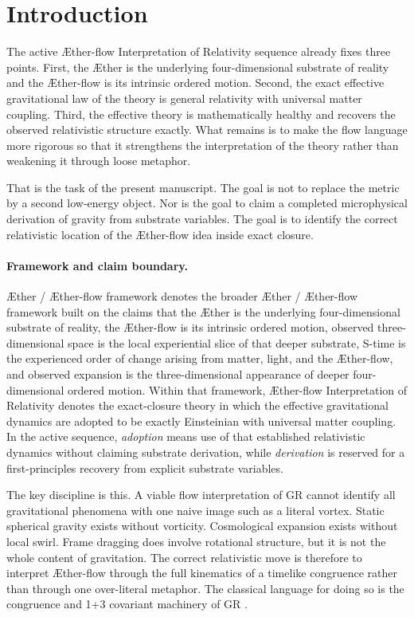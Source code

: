 \documentclass[11pt]{article}
\newcommand{\Aether}{\AE{}ther}
\newcommand{\Aflow}{\AE{}ther-flow}
\newcommand{\TheoryName}{\Aflow{} Interpretation of Relativity}
\newcommand{\TheoryProgram}{\Aether{} / \Aflow{} framework}
\begin{document}
\section{Introduction}

The active \TheoryName{} sequence already fixes three points. First, the \Aether{} is the underlying four-dimensional substrate of reality and the \Aflow{} is its intrinsic ordered motion. Second, the exact effective gravitational law of the theory is general relativity with universal matter coupling. Third, the effective theory is mathematically healthy and recovers the observed relativistic structure exactly. What remains is to make the flow language more rigorous so that it strengthens the interpretation of the theory rather than weakening it through loose metaphor.

That is the task of the present manuscript. The goal is not to replace the metric by a second low-energy object. Nor is the goal to claim a completed microphysical derivation of gravity from substrate variables. The goal is to identify the correct relativistic location of the \Aflow{} idea inside exact closure.

\paragraph{Framework and claim boundary.}
\TheoryProgram{} denotes the broader \Aether{} / \Aflow{} framework built on the claims that the \Aether{} is the underlying four-dimensional substrate of reality, the \Aflow{} is its intrinsic ordered motion, observed three-dimensional space is the local experiential slice of that deeper substrate, S-time is the experienced order of change arising from matter, light, and the \Aflow{}, and observed expansion is the three-dimensional appearance of deeper four-dimensional ordered motion. Within that framework, \TheoryName{} denotes the exact-closure theory in which the effective gravitational dynamics are adopted to be exactly Einsteinian with universal matter coupling. In the active sequence, \emph{adoption} means use of that established relativistic dynamics without claiming substrate derivation, while \emph{derivation} is reserved for a first-principles recovery from explicit substrate variables.

The key discipline is this. A viable flow interpretation of GR cannot identify all gravitational phenomena with one naive image such as a literal vortex. Static spherical gravity exists without vorticity. Cosmological expansion exists without local swirl. Frame dragging does involve rotational structure, but it is not the whole content of gravitation. The correct relativistic move is therefore to interpret \Aflow{} through the full kinematics of a timelike congruence rather than through one over-literal metaphor. The classical language for doing so is the congruence and 1+3 covariant machinery of GR \cite{Raychaudhuri1955,EllisVanElst1999}.
\end{document}
